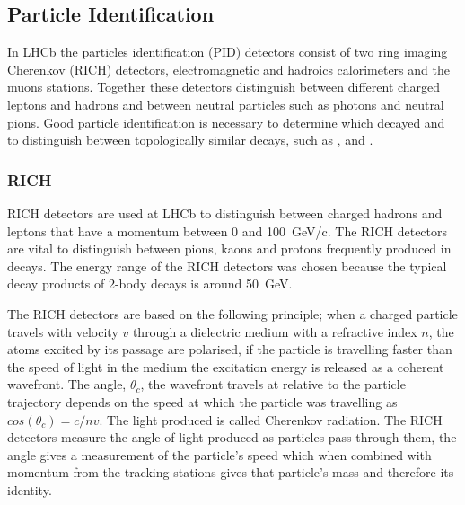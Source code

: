 \subsection{Particle Identification}
\label{PID}

In LHCb the particles identification (PID) detectors consist of two ring imaging Cherenkov (RICH) detectors, electromagnetic and hadroics calorimeters and the muons stations. Together these detectors distinguish between different charged leptons and hadrons and between neutral particles such as photons and neutral pions. Good particle identification is necessary to determine which \bhadron decayed and to distinguish between topologically similar decays, such as \bdkpi, \bskk and \bmumu. %



\subsubsection{RICH}
\label{RICH}

RICH detectors are used at LHCb to distinguish between charged hadrons and leptons that have a momentum between 0 and 100~GeV/c. The RICH detectors are vital to distinguish between pions, kaons and protons frequently produced in \bhadron decays. %
The energy range of the RICH detectors was chosen because the typical decay products of 2-body \bhadron decays is around 50~GeV. 



The RICH detectors are based on the following principle; when a charged particle travels with velocity $v$ through a dielectric medium with a refractive index $n$, the atoms excited by its passage are polarised, if the particle is travelling faster than the speed of light in the medium the excitation energy is released as a coherent wavefront. The angle, $\theta_{c}$, the wavefront travels at relative to the particle trajectory depends on the speed at which the particle was travelling as $cos(\theta_{c}) = c/nv$. The light produced is called Cherenkov radiation. The RICH detectors measure the angle of light produced as particles pass through them, the angle gives a measurement of the particle’s speed which when combined with momentum from the tracking stations gives that particle’s mass and therefore its identity. 


